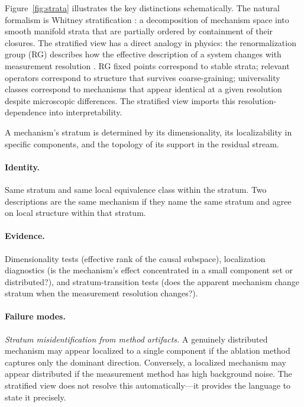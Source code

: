 \documentclass[11pt]{article}
\theoremstyle{remark}
\begin{document}
Figure~\ref{fig:strata} illustrates the key distinctions schematically.
The natural formalism is Whitney stratification \citep{whitney1965,golubitsky1973}:
a decomposition of mechanism space into smooth manifold strata that are
partially ordered by containment of their closures.  The stratified view
has a direct analogy in physics: the renormalization group (RG) describes
how the effective description of a system changes with measurement
resolution \citep{wilson1971,goldenfeld1992}.  RG fixed points correspond
to stable strata; relevant operators correspond to structure that survives
coarse-graining; universality classes correspond to mechanisms that appear
identical at a given resolution despite microscopic differences.  The
stratified view imports this resolution-dependence into interpretability.

A mechanism's stratum is determined
by its dimensionality, its localizability in specific components, and
the topology of its support in the residual stream.

\paragraph{Identity.}
Same stratum and same local equivalence class within the stratum.  Two
descriptions are the same mechanism if they name the same stratum and
agree on local structure within that stratum.

\paragraph{Evidence.}
Dimensionality tests (effective rank of the causal subspace),
localization diagnostics (is the mechanism's effect concentrated in a
small component set or distributed?), and stratum-transition tests
(does the apparent mechanism change stratum when the measurement
resolution changes?).

\paragraph{Failure modes.}
\emph{Stratum misidentification from method artifacts.}  A genuinely
distributed mechanism may appear localized to a single component if
the ablation method captures only the dominant direction.  Conversely,
a localized mechanism may appear distributed if the measurement method
has high background noise.  The stratified view does not resolve this
automatically---it provides the language to state it precisely.
\end{document}
